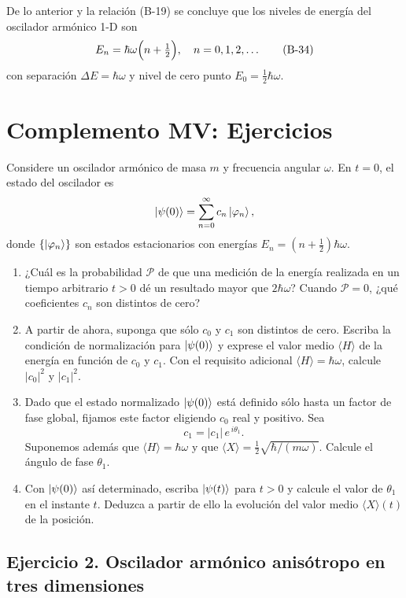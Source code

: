 \documentclass[a4paper,11pt]{article}
\begin{document}
De lo anterior y la relación (B-19) se concluye que los niveles de energía del oscilador armónico 1-D son
\[
E_n=\hbar\omega\Bigl(n+\tfrac12\Bigr),
\quad n=0,1,2,\dots
\tag{B-34}
\]
con separación \(\Delta E=\hbar\omega\) y nivel de cero punto \(E_0=\tfrac12\hbar\omega\).

\section*{Complemento MV: Ejercicios}

Considere un oscilador armónico de masa \(m\) y frecuencia angular \(\omega\). En \(t=0\), el estado del oscilador es
\[
\ket{\psi(0)}=\sum_{n=0}^\infty c_n\ket{\varphi_n},
\]
donde \(\{\ket{\varphi_n}\}\) son estados estacionarios con energías \(E_n=(n+\tfrac12)\hbar\omega\).

\begin{enumerate}
  \item ¿Cuál es la probabilidad \(\mathcal{P}\) de que una medición de la energía realizada en un tiempo arbitrario \(t>0\) dé un resultado mayor que \(2\hbar\omega\)? Cuando \(\mathcal{P}=0\), ¿qué coeficientes \(c_n\) son distintos de cero?
  \item A partir de ahora, suponga que sólo \(c_0\) y \(c_1\) son distintos de cero. Escriba la condición de normalización para \(\ket{\psi(0)}\) y exprese el valor medio \(\langle H\rangle\) de la energía en función de \(c_0\) y \(c_1\). Con el requisito adicional \(\langle H\rangle=\hbar\omega\), calcule \(\lvert c_0\rvert^2\) y \(\lvert c_1\rvert^2\).
  \item Dado que el estado normalizado \(\ket{\psi(0)}\) está definido sólo hasta un factor de fase global, fijamos este factor eligiendo \(c_0\) real y positivo. Sea
  \[
    c_1 = \lvert c_1\rvert\,e^{\,i\theta_1}.
  \]
  Suponemos además que 
  \(\langle H\rangle=\hbar\omega\) y que 
  \(\langle X\rangle=\tfrac12\sqrt{\hbar/(m\omega)}\).  
  Calcule el ángulo de fase \(\theta_1\).
  \item Con \(\ket{\psi(0)}\) así determinado, escriba \(\ket{\psi(t)}\) para \(t>0\) y calcule el valor de \(\theta_1\) en el instante \(t\). Deduzca a partir de ello la evolución del valor medio \(\langle X\rangle(t)\) de la posición.
\end{enumerate}

\subsection*{Ejercicio 2. Oscilador armónico anisótropo en tres dimensiones}
\end{document}
